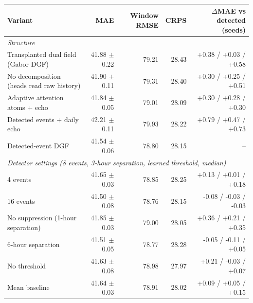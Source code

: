 \begin{tabular}{lrrrr}
\toprule
Variant & MAE & Window RMSE & CRPS & $\Delta$MAE vs detected (seeds) \\
\midrule
\multicolumn{5}{l}{\emph{Structure}} \\
Transplanted dual field (Gabor DGF) & 41.88 $\pm$ 0.22 & 79.21 & 28.43 & +0.38 / +0.03 / +0.58 \\
No decomposition (heads read raw history) & 41.90 $\pm$ 0.11 & 79.31 & 28.40 & +0.30 / +0.25 / +0.51 \\
Adaptive attention atoms + echo & 41.84 $\pm$ 0.05 & 79.01 & 28.09 & +0.30 / +0.28 / +0.30 \\
Detected events + daily echo & 42.21 $\pm$ 0.11 & 79.93 & 28.22 & +0.79 / +0.47 / +0.73 \\
Detected-event DGF & 41.54 $\pm$ 0.06 & 78.80 & 28.15 & -- \\
\midrule
\multicolumn{5}{l}{\emph{Detector settings (8 events, 3-hour separation, learned threshold, median)}} \\
4 events & 41.65 $\pm$ 0.03 & 78.85 & 28.25 & +0.13 / +0.01 / +0.18 \\
16 events & 41.50 $\pm$ 0.08 & 78.76 & 28.15 & -0.08 / -0.03 / -0.03 \\
No suppression (1-hour separation) & 41.85 $\pm$ 0.03 & 79.00 & 28.05 & +0.36 / +0.21 / +0.35 \\
6-hour separation & 41.51 $\pm$ 0.05 & 78.77 & 28.28 & -0.05 / -0.11 / +0.05 \\
No threshold & 41.63 $\pm$ 0.08 & 78.98 & 27.97 & +0.21 / -0.03 / +0.07 \\
Mean baseline & 41.64 $\pm$ 0.03 & 78.91 & 28.02 & +0.09 / +0.05 / +0.15 \\
\bottomrule
\end{tabular}
